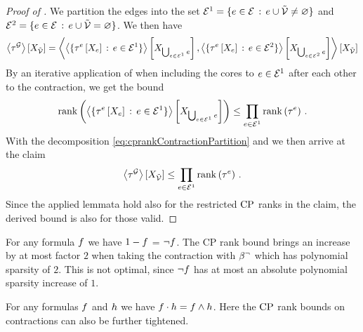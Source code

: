 \begin{proof}[Proof of ]
    We partition the edges into the set $\mathcal{E}^{1}= \{e\in\mathcal{E} \,:\, e\cup\tilde{\mathcal{V}}\neq\varnothing\}$ and $\mathcal{E}^{2}= \{e\in\mathcal{E} \,:\, e\cup\tilde{\mathcal{V}}=\varnothing\}$.
    We then have
    \begin{align}
        \label{eq:cprankContractionPartition}
        \left\langle \tau^{\mathcal{G}}\right\rangle \left[ X_{\tilde{\mathcal{V}}} \right]
        = \left\langle 
            \left\langle \{\tau^{e}\left[X_{e}\right] \,:\, e\in\mathcal{E}^{1}\}\right\rangle \left[ X_{\bigcup_{e\in\mathcal{E}^{1}}e} \right],
            \left\langle \{\tau^{e}\left[X_{e}\right] \,:\, e\in\mathcal{E}^{2}\}\right\rangle \left[ X_{\bigcup_{e\in\mathcal{E}^{2}}e} \right]
        \right\rangle \left[ X_{\tilde{\mathcal{V}}} \right]
    \end{align}
    By an iterative application of  when including the cores to $e\in\mathcal{E}^{1}$ after each other to the contraction, we get the bound
    \begin{align*}
        \mathrm{rank}\left(\left\langle \{\tau^{e}\left[X_{e}\right] \,:\, e\in\mathcal{E}^{1}\}\right\rangle \left[ X_{\bigcup_{e\in\mathcal{E}^{1}}e} \right]\right)
        \leq \prod_{e\in\mathcal{E}^{1}} \mathrm{rank}\left(\tau^{e}\right) \, .
    \end{align*}
    With the decomposition \eqref{eq:cprankContractionPartition} and  we then arrive at the claim
    \begin{align*}
        \left\langle \tau^{\mathcal{G}}\right\rangle \left[ X_{\tilde{\mathcal{V}}} \right] \leq \prod_{e\in\mathcal{E}^{1}} \mathrm{rank}\left(\tau^{e}\right) \, .
    \end{align*}
    Since the applied lemmata hold also for the restricted $\mathrm{CP}$ ranks in the claim, the derived bound is also for those valid.
\end{proof}


\begin{example}
    For any formula $f$ we have $1-f$ = $\lnot f$.
    The CP rank bound brings an increase by at most factor $2$ when taking the contraction with $\beta^{\lnot}$ which has polynomial sparsity of $2$.
    This is not optimal, since $\lnot f$ has at most an absolute polynomial sparsity increase of $1$.

    For any formulas $f$ and $h$ we have $f\cdot h = f\land h$.
    Here the $\mathrm{CP}$ rank bounds on contractions can also be further tightened.
\end{example}


